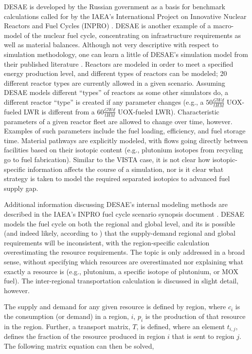 DESAE is developed by the Russian government as a basis for benchmark
calculations called for by the IAEA's International Project on Innovative
Nuclear Reactors and Fuel Cycles (INPRO)
\cite{_international_2009,andrianova_desae_2008}. DESAE is another example of a
macro-model of the nuclear fuel cycle, concentrating on infrastructure
requirements as well as material balances. Although not very descriptive with
respect to simulation methodology, one can learn a little of DESAE's simulation
model from their published literature \cite{andrianova_desae_2008}. Reactors are
modeled in order to meet a specified energy production level, and different
types of reactors can be modeled; 20 different reactor types are currently
allowed in a given scenario. Assuming DESAE models different ``types'' of
reactors as some other simulators do, a different reactor ``type'' is created if
any parameter changes (e.g., a $50 \frac{GW d}{tHM}$ UOX-fueled LWR is different
from a $60 \frac{GW d}{tHM}$ UOX-fueled LWR). Characteristic parameters of a
given reactor fleet are allowed to change over time, however. Examples of such
parameters include the fuel loading, efficiency, and fuel storage time. Material
pathways are explicitly modeled, with flows going directly between facilities
based on their isotopic content (e.g., plutonium isotopes from recycling go to
fuel fabrication). Similar to the VISTA case, it is not clear how
isotopic-specific information affects the course of a simulation, nor is it
clear what strategy is taken to model the required separated isotopics to
advanced fuel supply gap.

Additional information discussing DESAE's internal modeling methods are
described in the IAEA's INPRO fuel cycle scenario synopsis document
\cite{iaea_nuclear_2010}.  DESAE models the fuel cycle on both the regional and
global level, and its is possible (and indeed likely, according to
\cite{iaea_nuclear_2010}) that the supply-demand regional and global
requirements will be inconsistent, with the region-specific calculation
overestimating the resource requirements. The topic is only addressed in a broad
sense, without specifying which resources are overestimated nor explaining what
exactly a resource is (e.g., plutonium, a specific isotope of plutonium, or MOX
fuel). The inter-regional transportation calculation is discussed in slight
detail, however.

The supply and demand for any given resource is defined by region, where $c_i$
is the consumption (or demand) in a region, $i$, $p_i$ is the production of that
resource in the region. Further, a transport matrix, $T$, is defined, where an
element $t_{i,j}$, defines the fraction of the resource produced in region $i$
that is sent to region $j$. The following matrix equation can then be solved,

